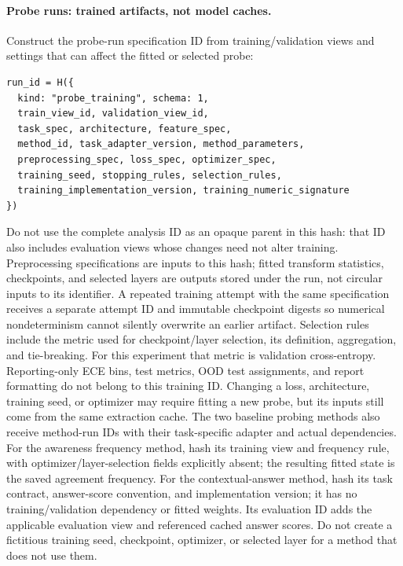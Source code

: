 \documentclass[11pt]{article}
\begin{document}
\paragraph{Probe runs: trained artifacts, not model caches.}
Construct the probe-run specification ID from training/validation views and settings that can affect the fitted or selected probe:
\begin{verbatim}
run_id = H({
  kind: "probe_training", schema: 1,
  train_view_id, validation_view_id,
  task_spec, architecture, feature_spec,
  method_id, task_adapter_version, method_parameters,
  preprocessing_spec, loss_spec, optimizer_spec,
  training_seed, stopping_rules, selection_rules,
  training_implementation_version, training_numeric_signature
})
\end{verbatim}
Do not use the complete analysis ID as an opaque parent in this hash: that ID also includes evaluation views whose changes need not alter training.
Preprocessing specifications are inputs to this hash; fitted transform statistics, checkpoints, and selected layers are outputs stored under the run, not circular inputs to its identifier.
A repeated training attempt with the same specification receives a separate attempt ID and immutable checkpoint digests so numerical nondeterminism cannot silently overwrite an earlier artifact.
Selection rules include the metric used for checkpoint/layer selection, its definition, aggregation, and tie-breaking.
For this experiment that metric is validation cross-entropy.
Reporting-only ECE bins, test metrics, OOD test assignments, and report formatting do not belong to this training ID.
Changing a loss, architecture, training seed, or optimizer may require fitting a new probe, but its inputs still come from the same extraction cache.
The two baseline probing methods also receive method-run IDs with their task-specific adapter and actual dependencies.
For the awareness frequency method, hash its training view and frequency rule, with optimizer/layer-selection fields explicitly absent; the resulting fitted state is the saved agreement frequency.
For the contextual-answer method, hash its task contract, answer-score convention, and implementation version; it has no training/validation dependency or fitted weights.
Its evaluation ID adds the applicable evaluation view and referenced cached answer scores.
Do not create a fictitious training seed, checkpoint, optimizer, or selected layer for a method that does not use them.
\end{document}
